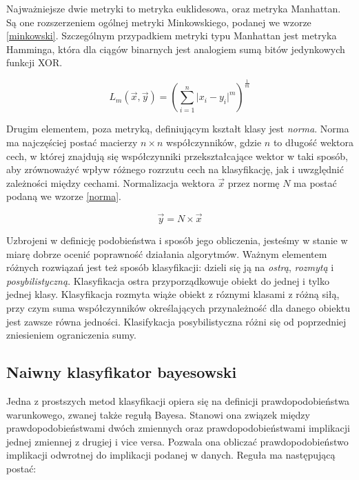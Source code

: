 \documentclass[12pt,a4paper,oneside]{report} %
\begin{document}
Najważniejsze dwie metryki to metryka euklidesowa, oraz metryka Manhattan. Są one rozszerzeniem ogólnej metryki Minkowskiego, podanej we wzorze \ref{minkowski}. Szczególnym przypadkiem metryki typu Manhattan jest metryka Hamminga, która dla ciągów binarnych jest analogiem sumą bitów jedynkowych funkcji XOR. \par

\begin{equation}
L_m(\vec{x},\vec{y}) = (\sum\limits_{i=1}^{n} \lvert x_i - y_i \rvert ^m)^{\frac{1}{m}}
\end{equation}
\label{minkowski}

Drugim elementem, poza metryką, definiującym kształt klasy jest \emph{norma}. Norma ma najczęściej postać macierzy $n \times n$ współczynników, gdzie $n$ to długość wektora cech, w której znajdują się współczynniki przekształcające wektor w taki sposób, aby zrównoważyć wpływ różnego rozrzutu cech na klasyfikację, jak i uwzględnić zależności między cechami. Normalizacja wektora $\vec{x}$ przez normę $N$ ma postać podaną we wzorze \ref{norma}. \cite{rutkowski} \par

\begin{equation}
\vec{y} = N \times \vec{x}
\end{equation}
\label{norma}

Uzbrojeni w definicję podobieństwa i sposób jego obliczenia, jesteśmy w stanie w miarę dobrze ocenić poprawność działania algorytmów. Ważnym elementem różnych rozwiązań jest też sposób klasyfikacji: dzieli się ją na \emph{ostrą}, \emph{rozmytą} i \emph{posybilistyczną}. Klasyfikacja ostra przyporządkowuje obiekt do jednej i tylko jednej klasy. Klasyfikacja rozmyta wiąże obiekt z róznymi klasami z różną siłą, przy czym suma współczynników określających przynależność dla danego obiektu jest zawsze równa jedności. Klasifykacja posybilistyczna różni się od poprzedniej zniesieniem ograniczenia sumy.\par


\subsection{Naiwny klasyfikator bayesowski}

Jedna z prostszych metod klasyfikacji opiera się na definicji prawdopodobieństwa warunkowego, zwanej także regułą Bayesa. Stanowi ona związek między prawdopodobieństwami dwóch zmiennych oraz prawdopodobieństwami implikacji jednej zmiennej z drugiej i vice versa. Pozwala ona obliczać prawdopodobieństwo implikacji odwrotnej do implikacji podanej w danych. Reguła ma następującą postać:\par
\end{document}
